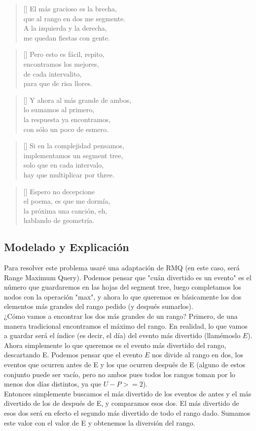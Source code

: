 \documentclass[a4paper]{article}
\newcommand{\verso}[1] {
\settowidth{\versewidth}{123456789012345678901234567890}%
\begin{minipage}[t]{\dimexpr\versewidth+1pt\relax}
\begin{verse}[\versewidth]
{\fontfamily{qzc}\selectfont\large
  #1
}
\end{verse}
\end{minipage}\bigskip
}
\begin{document}
\verso{ %
El más gracioso es la brecha,\\
que al rango en dos me segmente.\\
A la izquierda y la derecha,\\
me quedan fiestas con gente.\\
}
\verso{ %
Pero esto es fácil, repito,\\
encontramos los mejores,\\
de cada intervalito,\\
para que de risa llores.\\
}
\verso{ %
Y ahora al más grande de ambos,\\
lo sumamos al primero,\\
la respuesta ya encontramos,\\
con sólo un poco de esmero.\\
}
\verso{ %
Si en la complejidad pensamos,\\
implementamos un segment tree,\\
solo que en cada intervalo,\\
hay que multiplicar por three.\\
}
\verso{ %
Espero no decepcione\\
el poema, es que me dormía,\\
la próxima una canción, eh,\\
hablando de geometría.\\
}

\subsection{Modelado y Explicación}

Para resolver este problema usaré una adaptación de RMQ (en este caso, será Range Maximum Query). Podemos pensar que "cuán divertido es un evento" es el número que guardaremos en las hojas del segment tree, luego completamos los nodos con la operación "max", y ahora lo que queremos es básicamente los dos elementos más grandes del rango pedido (y después sumarlos).\\
¿Cómo vamos a encontrar los dos más grandes de un rango? Primero, de una manera tradicional encontramos el máximo del rango. En realidad, lo que vamos a guardar será el índice (es decir, el día) del evento más divertido (llamémoslo $E$). Ahora simplemente lo que queremos es el evento más divertido del rango, descartando E. Podemos pensar que el evento $E$ nos divide al rango en dos, los eventos que ocurren antes de E y los que ocurren después de E (alguno de estos conjunto puede ser vacío, pero no ambos pues todos los rangos toman por lo menos dos días distintos, ya que $U-P>=2$).\\
Entonces simplemente buscamos el más divertido de los eventos de antes y el más divertido de los de después de E, y comparamos esos dos. El más divertido de esos dos será en efecto el segundo más divertido de todo el rango dado. Sumamos este valor con el valor de E y obtenemos la diversión del rango.
\end{document}
